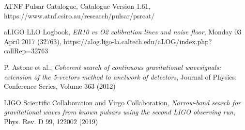 \documentclass[11pt,a4paper,final]{iopart}
\begin{document}
\begin{thebibliography}{10}
 ATNF Pulsar Catalogue, Catalogue Version 1.61, https://www.atnf.csiro.au/research/pulsar/psrcat/

  aLIGO LLO Logbook, \emph{ER10 vs O2 calibration lines and noise floor}, Monday 03 April 2017 (32763), https://alog.ligo-la.caltech.edu/aLOG/index.php?callRep=32763

 P. Astone et al., \emph{Coherent search of continuous gravitational wavesignals: extension of the 5-vectors method to anetwork of detectors},  Journal of Physics: Conference Series, Volume 363 (2012)

LIGO Scientific Collaboration and Virgo Collaboration, \emph{Narrow-band search for gravitational waves from known pulsars using the second LIGO observing run}, Phys. Rev. D 99, 122002 (2019)





\end{thebibliography}
\end{document}
